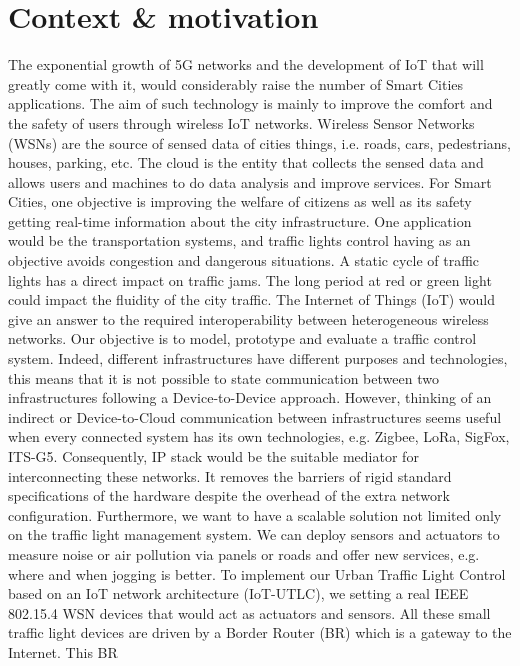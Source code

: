 \section{Context \& motivation}


The exponential growth of 5G networks and the development of IoT that will greatly come with it,
	would considerably raise the number of Smart Cities applications.
The aim of such technology is mainly to improve the comfort and the safety of users through wireless IoT networks.
Wireless Sensor Networks (WSNs) are the source of sensed data of cities things,
	i.e.
roads,
	cars,
	pedestrians,
	houses,
	parking,
	etc.
The cloud is the entity that collects the sensed data and allows users and machines to do data analysis and improve services.
For Smart Cities,
	one objective is improving the welfare of citizens as well as its safety getting real-time information about the city infrastructure.
One application would be the transportation systems,
	and traffic lights control having as an objective avoids congestion and dangerous situations.
A static cycle of traffic lights has a direct impact on traffic jams.
The long period at red or green light could impact the fluidity of the city traffic.
The Internet of Things (IoT) would give an answer to the required interoperability between heterogeneous wireless networks.
Our objective is to model,
	prototype and evaluate a traffic control system.
Indeed,
	different infrastructures have different purposes and technologies,
	this means that it is not possible to state communication between two infrastructures following a Device-to-Device approach.
However,
	thinking of an indirect or Device-to-Cloud communication between infrastructures seems useful when every connected system has its own technologies,
	e.g.
Zigbee,
	LoRa,
	SigFox,
	ITS-G5.
Consequently,
	IP stack would be the suitable mediator for interconnecting these networks.
It removes the barriers of rigid standard specifications of the hardware despite the overhead of the extra network configuration.
Furthermore,
	we want to have a scalable solution not limited only on the traffic light management system.
We can deploy sensors and actuators to measure noise or air pollution via panels or roads and offer new services,
	e.g.
where and when jogging is better.
To implement our Urban Traffic Light Control based on an IoT network architecture (IoT-UTLC),
	we setting a real IEEE 802.15.4 WSN devices that would act as actuators and sensors.
All these small traffic light devices are driven by a Border Router (BR) which is a gateway to the Internet.
This BR 

